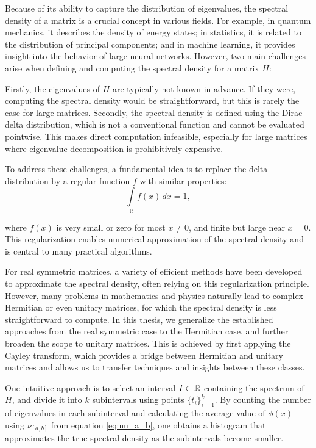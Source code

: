 Because of its ability to capture the distribution of eigenvalues,
the spectral density of a matrix is a crucial concept in various fields.
For example, in quantum mechanics, it describes the density of energy states;
in statistics, it is related to the distribution of principal components;
and in machine learning, it provides insight into the behavior of large neural networks.
However, two main challenges arise when defining and computing the spectral density for a matrix $H$:

Firstly, the eigenvalues of $H$ are typically not known in advance.
If they were, computing the spectral density would be straightforward,
but this is rarely the case for large matrices.
Secondly, the spectral density is defined using the Dirac delta distribution,
which is not a conventional function and cannot be evaluated pointwise.
This makes direct computation infeasible,
especially for large matrices where eigenvalue decomposition is prohibitively expensive.

To address these challenges, a fundamental idea is to replace the delta distribution by a regular function $f$ with similar properties:
\begin{equation} \label{integral_equals_one}
    \int\limits_{\mathbb{R}} f(x)\, dx = 1,
\end{equation}

where $f(x)$ is very small or zero for most $x \neq 0$, and finite but large near $x = 0$. This regularization enables numerical approximation of the spectral density and is central to many practical algorithms.

For real symmetric matrices, a variety of efficient methods have been developed to approximate the spectral density,
often relying on this regularization principle.
However, many problems in mathematics and physics naturally lead to complex Hermitian or even unitary matrices,
for which the spectral density is less straightforward to compute.
In this thesis, we generalize the established approaches from the real symmetric case to the Hermitian case,
and further broaden the scope to unitary matrices.
This is achieved by first applying the Cayley transform, which provides a bridge between Hermitian and unitary matrices
and allows us to transfer techniques and insights between these classes.

One intuitive approach is to select an interval $I \subset \mathbb{R}$ containing the spectrum of $H$,
and divide it into $k$ subintervals using points $\{t_i\}_{i=1}^k$.
By counting the number of eigenvalues in each subinterval
and calculating the average value of $\phi(x)$ using $\nu_{[a, b]}$ from equation \ref{eq:nu_a_b},
one obtains a histogram that approximates the true spectral density as the subintervals become smaller.

